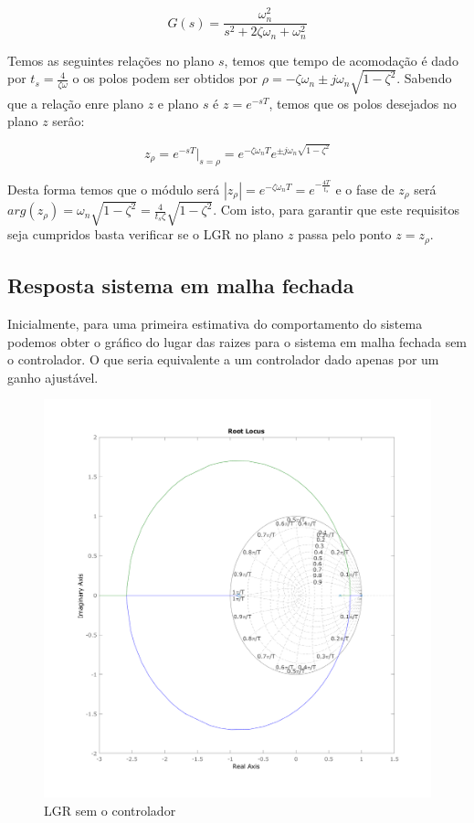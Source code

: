 \documentclass[a4paper,11pt]{article}
\begin{document}
\begin{equation}
    G(s) = \frac{\omega_n^2}{s^2 + 2\zeta\omega_n + \omega_n^2}
\end{equation}

Temos as seguintes relações no plano $s$, temos que tempo de acomodação é dado por $t_s = \frac{4}{\zeta\omega}$
o os polos podem ser obtidos por $ \rho = -\zeta\omega_n \pm j\omega_n\sqrt{1-\zeta^2}$. Sabendo que a relação enre plano $z$ e plano $s$ é $z=e^{-sT}$, temos que os polos desejados no plano $z$ serâo:

\begin{equation}
    z_{\rho} = e^{-sT}|_{s=\rho} =  e^{-\zeta\omega_n T} e^{\pm j\omega_n\sqrt{1-\zeta^2}}
\end{equation}

Desta forma temos que o módulo será $|z_{\rho}| =  e^{-\zeta\omega_n T} = e^{-\frac{4T}{t_s}}$ e o fase de $z_\rho$ será $arg(z_{\rho}) = \omega_n\sqrt{1-\zeta^2} = \frac{4}{t_s\zeta}\sqrt{1-\zeta^2}$. Com isto, para garantir que este requisitos seja cumpridos basta verificar se o LGR no plano $z$ passa pelo ponto $z = z_{\rho}$.

\subsection{Resposta sistema em malha fechada}


Inicialmente, para uma primeira estimativa do comportamento do sistema podemos obter o gráfico do lugar das raizes para o sistema em malha fechada sem o controlador. O que seria equivalente a um controlador dado apenas por um ganho ajustável.

\begin{figure}[H]
    \centering
    \includegraphics[width=0.9\linewidth]{img/exsim3-rlocus-g2.png}
    \caption{LGR sem o controlador}
    \label{fig:ex3-rlocus-g2}
\end{figure}
\end{document}
